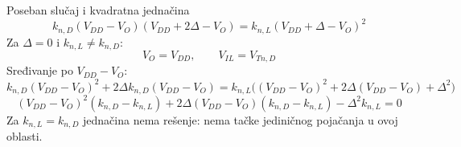 \begin{frame}[label=09_1-s041]{Poseban slučaj i kvadratna jednačina}\setlength{\parskip}{2pt}\setlength{\abovedisplayskip}{4pt}\setlength{\belowdisplayskip}{4pt}\setlength{\abovedisplayshortskip}{3pt}\setlength{\belowdisplayshortskip}{3pt}
\[k_{n,D}(V_{DD}-V_O)(V_{DD}+2\Delta-V_O)=k_{n,L}(V_{DD}+\Delta-V_O)^2\]
Za $\Delta=0$ i $k_{n,L}\ne k_{n,D}$:\[V_O=V_{DD},\qquad V_{IL}=V_{Tn,D}\]
Sređivanje po $V_{DD}-V_O$:\[k_{n,D}(V_{DD}-V_O)^2+2\Delta k_{n,D}(V_{DD}-V_O)=k_{n,L}\bigl((V_{DD}-V_O)^2+2\Delta(V_{DD}-V_O)+\Delta^2\bigr)\]
\[(V_{DD}-V_O)^2(k_{n,D}-k_{n,L})+2\Delta(V_{DD}-V_O)(k_{n,D}-k_{n,L})-\Delta^2 k_{n,L}=0\]
Za $k_{n,L}=k_{n,D}$ jednačina nema rešenje: nema tačke jediničnog pojačanja u ovoj oblasti.
\end{frame}
